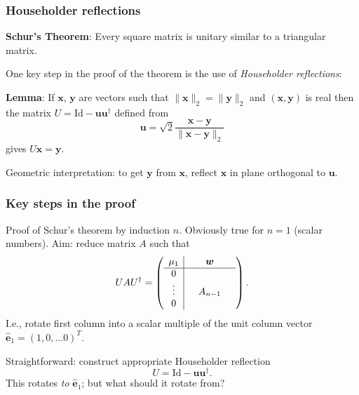 \documentclass{beamer}
\newcommand{\bfm}[1]{{\boldsymbol{#1}}}
\newcommand{\bx}{\bfm{x}}
\begin{document}
\begin{frame}
  \frametitle{Householder reflections}

  {\bf Schur's Theorem}: Every square matrix is unitary similar to a
  triangular matrix.

  \vspace{1ex}

  One key step in the proof of the theorem is the use of
  \emph{Householder reflections}:

  \vspace{1ex}

  {\bf Lemma}: If $\bx$, $\bfm{y}$ are vectors such that $\|\bx\|_2 =
  \|\bfm{y}\|_2$ and $(\bx,\bfm{y})$ is real then the matrix $U = \text{Id} -
  \bfm{u} \bfm{u}^{\dagger}$ defined from
  \begin{equation*}
    \bfm{u} = \sqrt{2} \frac{\bx - \bfm{y}}{\|\bx - \bfm{y}\|_2}
  \end{equation*}
  gives $U \bx = \bfm{y}$. \pause

  \vspace{1ex}

  Geometric interpretation: to get $\bfm{y}$ from $\bx$,
  reflect $\bx$ in plane orthogonal to $\bfm{u}$.

\end{frame}

\begin{frame}
  \frametitle{Key steps in the proof}

  Proof of Schur's theorem by induction $n$. Obviously true
  for $n=1$ (scalar numbers). Aim: reduce matrix $A$ such that
  \begin{equation*}
    U A U^{\dagger} = \left(
      \begin{array}{c|c c c}
        \mu_1 & & \bfm{w}& \\ \hline
        0 & &  & \\
        \vdots & & A_{n-1}  & \\
        0 & &  & \\
      \end{array}\right).
  \end{equation*}
  I.e., rotate first column into a scalar multiple of the unit column
  vector $\hat{\bfm{e}}_1 = (1, 0, \dots 0)^T$.  \pause

  \vspace{1ex}

  Straightforward: construct appropriate Householder reflection
  \begin{equation*}
    U = \text{Id} - \bfm{u}\bfm{u}^{\dagger}.
  \end{equation*}
  This rotates \emph{to} $\hat{\bfm{e}}_1$; but what should it rotate
  from?

\end{frame}
\end{document}
